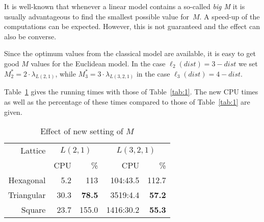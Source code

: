 \documentclass[smallextended]{svjour3}
\begin{document}
It is well-known that whenever a linear model contains a so-called \emph{big M} 
it is usually advantageous to find the smallest possible value for~$M$. 
A speed-up of the computations can be expected. However, this is not 
guaranteed and the effect can also be converse. 

\begin{comment} 
A good value for $M$ is clearly not smaller than the value that CPLEX 
would find for $\lambda+j_1$. But with this property it should 
be as small as possible since the bigger the value of $M$ is, the 
larger the size of the search space. The fact is that we have more 
inequalities, in this point the problem should be more complex. But 
the other side, these inequalities can help in the process of Branch-and-Bound, 
that can make the calculations faster. So, it should be tried to see 
whether the modification is effective in some cases. For this purpose, 
we must be able to estimate the results. A correct estimation of the 
value multiplied by a constant is already useful (if it is smaller 
than the original $M$-value). 
\end{comment} 

Since the optimum values from the classical 
model are available, it is easy to get good $M$ values for the Euclidean 
model. In the case $\ell_{2}(dist)=3-dist$ we set $M_{2}^{*}=2\cdot\lambda_{L(2,1)}$, 
while $M_{3}^{*}=3\cdot\lambda_{L(3,2,1)}$ in the case $\ell_{3}(dist)=4-dist$. 

Table~\ref{tab:4} gives the running times with those of Table~\ref{tab:1}. 
The new CPU times as well as the percentage of these times compared to 
those of Table~\ref{tab:1} are given. 

\begin{table}[h] 
\begin{center} 
\renewcommand{\arraystretch}{1.3} 
\renewcommand{\tabcolsep}{10pt} 
\begin{tabular}{|r||r|r||r|r|} 
\hline 
Lattice  & \multicolumn{2}{c||}{$L(2,1)$} & \multicolumn{2}{c|}{$L(3,2,1)$} \\ 
  & CPU & \% & CPU & \%\\ 
\hline 
Hexagonal & 5.2 & 113 & 104:43.5 & 112.7 \\ 
\hline 
Triangular  & 30.3 & \textbf{78.5} & 3519:4.4 & \textbf{57.2} \\ 
\hline 
Square      & 23.7 & 155.0 & 1416:30.2 & \textbf{55.3} \\ 
\hline 
\end{tabular} 
\end{center} 
\caption{Effect of new setting of $M$}\label{tab:4} 
\end{table} 
\end{document}
